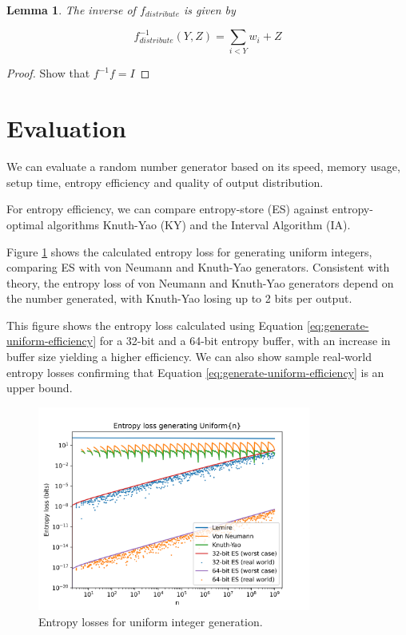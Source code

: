 \documentclass[12pt]{article}
\newtheorem{lemma}{Lemma}
\begin{document}
\begin{lemma}
The inverse of $f_{distribute}$ is given by

    \begin{equation}
    f^{-1}_{distribute}(Y,Z) = \sum_{i<Y}w_i + Z
    \end{equation}
\end{lemma}

\begin{proof}
    Show that $f^{-1}f= I$

\end{proof}




\section {Evaluation}

We can evaluate a random number generator based on its speed, memory usage, setup time, entropy efficiency and quality of output distribution. \cite{saad2025}

For entropy efficiency, we can compare entropy-store (ES) against entropy-optimal algorithms Knuth-Yao (KY) and the Interval Algorithm (IA).

Figure \ref{fig:uniform-losses} shows the calculated entropy loss for generating uniform integers, comparing ES with von Neumann and Knuth-Yao generators. Consistent with theory, the entropy loss of von Neumann and Knuth-Yao generators depend on the number generated, with Knuth-Yao losing up to 2 bits per output.

This figure shows the entropy loss calculated using Equation \ref{eq:generate-uniform-efficiency} for a 32-bit and a 64-bit entropy buffer, with an increase in buffer size yielding a higher efficiency. We can also show sample real-world entropy losses confirming that Equation \ref{eq:generate-uniform-efficiency} is an upper bound.

\begin{figure}[ht]
\centering
\includegraphics[width=0.8\textwidth]{uniform_losses.png}
\caption{Entropy losses for uniform integer generation.}
\label{fig:uniform-losses}
\end{figure}
\end{document}
